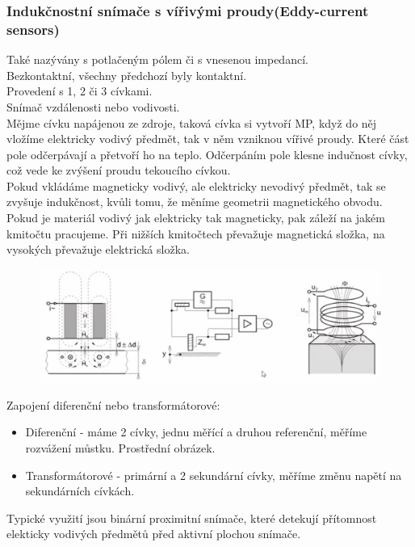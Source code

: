 \subsubsection{Indukčnostní snímače s vířivými proudy(Eddy-current sensors)}
Také nazývány s potlačeným pólem či s vnesenou impedancí.\\
Bezkontaktní, všechny předchozí byly kontaktní.\\
Provedení s 1, 2 či 3 cívkami.\\
Snímač vzdálenosti nebo vodivosti.\\
Mějme cívku napájenou ze zdroje, taková cívka si vytvoří MP, když do něj vložíme elektricky vodivý předmět, tak v něm vzniknou vířivé proudy. Které část pole odčerpávají a přetvoří ho na teplo. Odčerpáním pole klesne indučnost cívky, což vede ke zvýšení proudu tekoucího cívkou.\\
Pokud vkládáme magneticky vodivý, ale elektricky nevodivý předmět, tak se zvyšuje indukčnost, kvůli tomu, že měníme geometrii magnetického obvodu.\\
Pokud je materiál vodivý jak elektricky tak magneticky, pak záleží na jakém kmitočtu pracujeme. Při nižších kmitočtech převažuje magnetická složka, na vysokých převažuje elektrická složka.\\
\begin{figure}[h!]
    \centering
    \includegraphics[scale = 0.2]{img/EddyCurr.png}
\end{figure}
Zapojení diferenční nebo transformátorové:
\begin{itemize}
    \item Diferenční - máme 2 cívky, jednu měřící a druhou referenční, měříme rozvážení můstku. Prostřední obrázek.
    \item Transformátorové - primární a 2 sekundární cívky, měříme změnu napětí na sekundárních cívkách.
\end{itemize}
Typické využití jsou binární proximitní snímače, které detekují přítomnost elekticky vodivých předmětů před aktivní plochou snímače.\\

